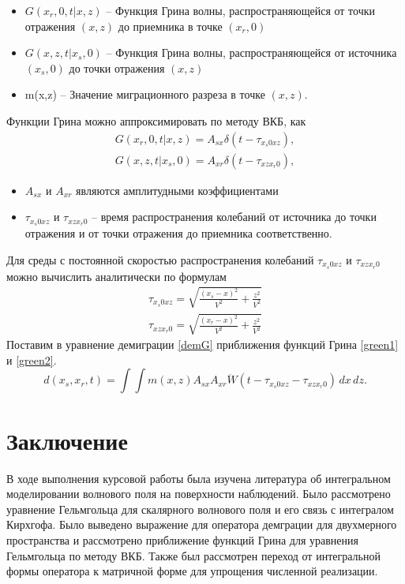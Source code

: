 \documentclass[a4paper, fontsize=14pt]{article}
\begin{document}
	\begin{itemize}
		\item $G(x_r,0,t|x,z)$ -- Функция Грина волны, распространяющейся от точки отражения $(x,z)$
		до приемника в точке $(x_r,0)$
		\item $G(x,z,t|x_s,0)$ -- Функция Грина волны, распространяющейся от источника $(x_s,0)$
		до точки отражения $(x,z)$
		\item m(x,z) -- Значение миграционного разреза в точке $(x,z)$.
	\end{itemize}
		Функции Грина можно аппроксимировать по методу ВКБ, как
	\begin{gather}
		\label{green1}
		G(x_r,0,t|x,z) = A_{sx} \delta(t - \tau_{x_s0xz}), \\
		\label{green2}
		G(x,z,t|x_s,0) = A_{xr} \delta(t - \tau_{xzx_r0}),
	\end{gather}
	\begin{itemize}
		\item 	$A_{sx}$ и $A_{xr}$ являются амплитудными коэффициентами
		\item 	$\tau_{x_s0xz}$ и $\tau_{xzx_r0}$ -- время распространения колебаний от источника до точки отражения и от точки отражения до приемника соответственно.
	\end{itemize}
	Для среды с постоянной скоростью распространения колебаний $\tau_{x_s0xz}$ и $\tau_{xzx_r0}$ можно вычислить аналитически по формулам
	\begin{gather}
		\tau_{x_s0xz} = \sqrt{\frac{(x_s - x)^2}{V^2} + \frac{z^2}{V^2}} \\
		\tau_{xzx_r0} = \sqrt{\frac{(x_r - x)^2}{V^2} + \frac{z^2}{V^2}}
	\end{gather}
	Поставим в уравнение демиграции \ref{demG} приближения функций Грина \ref{green1} и \ref{green2}.
	\begin{equation}
		d(x_s,x_r,t) = \int \int m(x,z) A_{sx} A_{xr} \ddot{W}(t- \tau_{x_s0xz} -\tau_{xzx_r0} )\,dx\,dz.
	\end{equation}
	



\clearpage


\section*{Заключение}
В ходе выполнения курсовой работы была изучена литература об интегральном моделировании волнового
поля на поверхности наблюдений. Было рассмотрено уравнение Гельмгольца для скалярного волнового
поля и его связь с интегралом Кирхгофа. Было выведено выражение для оператора демграции для
двухмерного пространства и рассмотрено приближение функций Грина для уравнения Гельмгольца по методу
ВКБ. Также был рассмотрен переход от интегральной формы оператора к матричной форме для
упрощения численной реализации.
\end{document}
